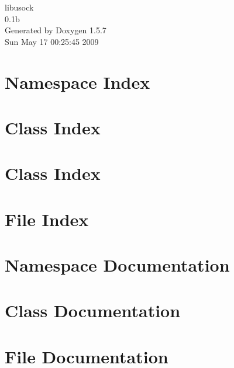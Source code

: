 \documentclass[a4paper]{book}
\begin{document}
\begin{titlepage}
\vspace*{7cm}
\begin{center}
{\Large libusock \\[1ex]\large 0.1b }\\
\vspace*{1cm}
{\large Generated by Doxygen 1.5.7}\\
\vspace*{0.5cm}
{\small Sun May 17 00:25:45 2009}\\
\end{center}
\end{titlepage}
\clearemptydoublepage
{}
\tableofcontents
\clearemptydoublepage
{}
\chapter{Namespace Index}

\chapter{Class Index}

\chapter{Class Index}

\chapter{File Index}

\chapter{Namespace Documentation}

\chapter{Class Documentation}






\chapter{File Documentation}


\printindex
\end{document}
